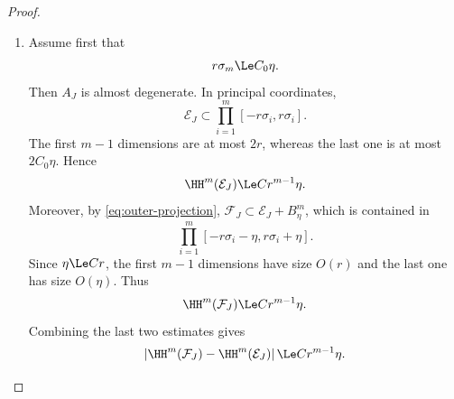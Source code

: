 \begin{proof}
\begin{enumerate}
\item Assume first that
\[
 r\sigma_m\Le C_0\eta.
\]
Then $A_J$ is almost degenerate. In principal coordinates,
\[
 \mathcal E_J\subset\prod_{i=1}^m[-r\sigma_i,r\sigma_i].
\]
The first $m-1$ dimensions are at most $2r$, whereas the last one is
at most $2C_0\eta$. Hence
\begin{equation}
\label{eq:degenerate-ellipsoid-volume}
 \HH^m(\mathcal E_J)\Le C r^{m-1}\eta.
\end{equation}
Moreover, by \eqref{eq:outer-projection},
$\mathcal F_J\subset\mathcal E_J+B^m_\eta$, which is contained in
\[
 \prod_{i=1}^m[-r\sigma_i-\eta,r\sigma_i+\eta].
\]
Since $\eta\Le Cr$, the first $m-1$ dimensions have size $O(r)$ and
the last one has size $O(\eta)$. Thus
\begin{equation}
\label{eq:degenerate-F-volume}
 \HH^m(\mathcal F_J)\Le C r^{m-1}\eta.
\end{equation}
Combining the last two estimates gives
\begin{equation}
\label{eq:degenerate-result}
 \left|\HH^m(\mathcal F_J)-\HH^m(\mathcal E_J)\right|
 \Le C r^{m-1}\eta.
\end{equation}


\end{enumerate}
\end{proof}
